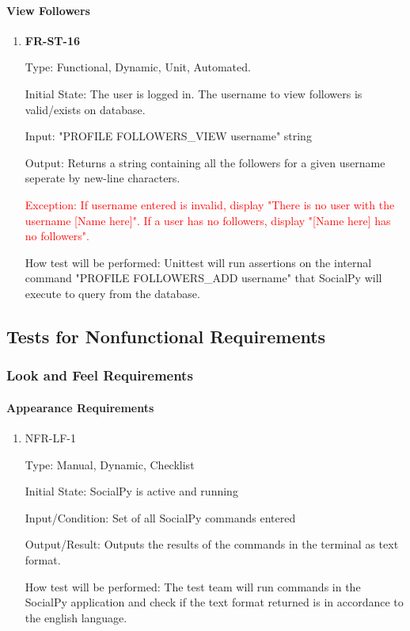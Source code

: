 \documentclass[12pt, titlepage]{article}
\begin{document}
\paragraph{View Followers}

\begin{enumerate}

\item{\textbf{FR-ST-16}}

Type: Functional, Dynamic, Unit, Automated.
					
Initial State: The user is logged in. The username to view followers is valid/exists on database.
					
Input: "PROFILE FOLLOWERS\_VIEW username" string
					
Output: Returns a string containing all the followers for a given username seperate by new-line characters.

\textcolor{red}{Exception: If username entered is invalid, display "There is no user with the username [Name here]". If a user has no followers, display "[Name here] has no followers".}
					
How test will be performed: Unittest will run assertions on the internal command "PROFILE FOLLOWERS\_ADD username" that SocialPy will execute to query from the database.
\end{enumerate}

\subsection{Tests for Nonfunctional Requirements}

\subsubsection{Look and Feel Requirements}
		
\paragraph{Appearance Requirements}

\begin{enumerate}

\item{NFR-LF-1\\}

Type: Manual, Dynamic, Checklist
					
Initial State: SocialPy is active and running
					
Input/Condition: Set of all SocialPy commands entered
					
Output/Result: Outputs the results of the commands in the terminal as text format.
					
How test will be performed: The test team will run commands in the SocialPy application and check if the text format returned is in accordance to the english language.

\end{enumerate}
\end{document}
